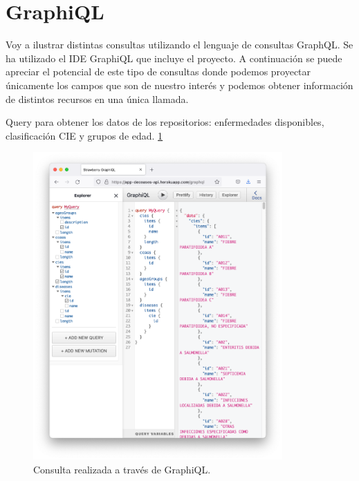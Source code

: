 \section{GraphiQL}
Voy a ilustrar distintas consultas utilizando el lenguaje de consultas GraphQL. Se ha 
utilizado el IDE GraphiQL que incluye el proyecto. A continuación se puede apreciar el 
potencial de este tipo de consultas donde podemos proyectar únicamente los campos que 
son de nuestro interés y podemos obtener información de distintos recursos en una única llamada.

\vskip 0.4in

Query para obtener los datos de los repositorios: enfermedades disponibles, clasificación CIE y grupos de edad. \ref{fig:4}
\FloatBarrier
\begin{figure}[h]
	\centering
	\includegraphics[width=0.85\textwidth]{doc/logos/imgs/ejemplo3.png}
	\caption{ Consulta realizada a través de GraphiQL. }
	\label{fig:4}
\end{figure}
\FloatBarrier

